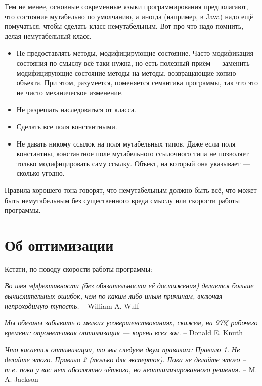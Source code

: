 \documentclass{../../text-style}
\begin{document}
Тем не менее, основные современные языки программирования предполагают, что состояние мутабельно по умолчанию, а иногда (например, в Java) надо ещё помучаться, чтобы сделать класс немутабельным. Вот про что надо помнить, делая немутабельный класс.

\begin{itemize}
    \item Не предоставлять методы, модифицирующие состояние. Часто модификация состояния по смыслу всё-таки нужна, но есть полезный приём --- заменить модифицирующие состояние методы на методы, возвращающие копию объекта. При этом, разумеется, поменяется семантика программы, так что это не чисто механическое изменение.
    \item Не разрешать наследоваться от класса.
    \item Сделать все поля константными.
    \item Не давать никому ссылок на поля мутабельных типов. Даже если поля константны, константное поле мутабельного ссылочного типа не позволяет только модифицировать саму ссылку. Объект, на который она указывает --- сколько угодно.
\end{itemize}

Правила хорошего тона говорят, что немутабельным должно быть всё, что может быть немутабельным без существенного вреда смыслу или скорости работы программы.

\section{Об оптимизации}

Кстати, по поводу скорости работы программы:

\textit{Во имя эффективности (без обязательности её достижения) делается больше вычислительных ошибок, чем по каким-либо иным причинам, включая непроходимую тупость.} \newline
-- William A. Wulf 

\textit{Мы обязаны забывать о мелких усовершенствованиях, ска­жем, на 97\% рабочего времени: опрометчивая оптимизация --- корень всех зол.} \newline
-- Donald E. Knuth

\textit{Что касается оптимизации, то мы следуем двум правилам: \newline
Правило 1. Не делайте этого. \newline
Правило 2 (только для экспертов). Пока не делайте этого -- т.е. пока у вас нет абсолютно чёткого, но неоптимизированного решения.} \newline
-- M. A. Jackson
\end{document}
